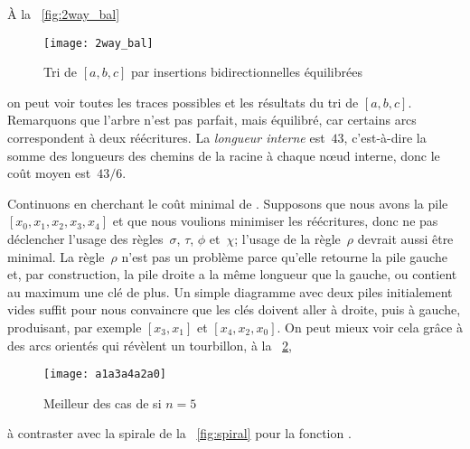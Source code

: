 À la \fig~\vref{fig:2way_bal}
\begin{figure}
\centering
\texttt{[image: 2way\_bal]}
\caption{Tri de \([a,b,c]\) par insertions bidirectionnelles équilibrées}
\label{fig:2way_bal}
\end{figure}
on peut voir toutes les traces possibles et les résultats du tri de \([a,b,c]\). Remarquons que
l'arbre n'est pas parfait, mais équilibré,
car certains arcs correspondent à deux réécritures. La \emph{longueur
  interne}\label{insertion__internal_path_length}  est~\(43\), c'est-à-dire la somme des
longueurs des chemins de la racine à chaque nœud interne, donc le
coût moyen est~\(43/6\).


Continuons en cherchant le coût minimal de . Supposons que
nous avons la pile \([x_0, x_1, x_2, x_3, x_4]\) et que nous voulions
minimiser les réécritures, donc ne pas déclencher l'usage des
règles~\(\sigma\), \(\tau\), \(\phi\) et~\(\chi\); l'usage de la
règle~\(\rho\) devrait aussi être minimal. La règle~\(\rho\) n'est pas
un problème parce qu'elle retourne la pile gauche et, par
construction, la pile droite a la même longueur que la gauche, ou
contient au maximum une clé de plus. Un simple diagramme avec deux
piles initialement vides suffit pour nous convaincre que les clés
doivent aller à droite, puis à gauche, produisant, par exemple \([x_3
, x_1]\) et \([x_4, x_2, x_0]\). On peut mieux voir cela grâce à des
arcs orientés qui révèlent un tourbillon, à la
\fig~\ref{fig:whirlpool},
\begin{figure}[b]
\centering
\texttt{[image: a1a3a4a2a0]}
\caption{Meilleur des cas de  si \(n=5\)}
\label{fig:whirlpool}
\end{figure}
à contraster avec la spirale de la \fig~\vref{fig:spiral} pour
la fonction .

